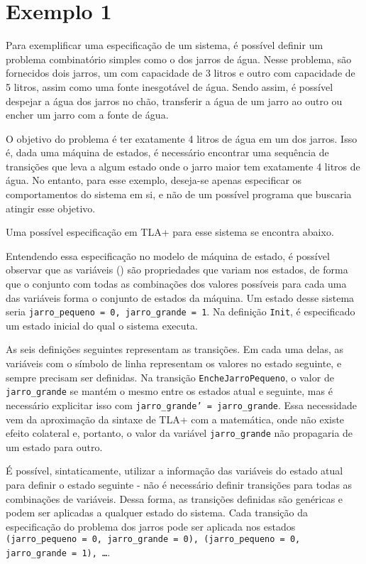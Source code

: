 \section{Exemplo 1}

Para exemplificar uma especificação de um sistema, é possível definir um problema combinatório simples como o dos jarros de água. Nesse problema, são fornecidos dois jarros, um com capacidade de 3 litros e outro com capacidade de 5 litros, assim como uma fonte inesgotável de água. Sendo assim, é possível despejar a água dos jarros no chão, transferir a água de um jarro ao outro ou encher um jarro com a fonte de água.

O objetivo do problema é ter exatamente 4 litros de água em um dos jarros. Isso é, dada uma máquina de estados, é necessário encontrar uma sequência de transições que leva a algum estado onde o jarro maior tem exatamente 4 litros de água. No entanto, para esse exemplo, deseja-se apenas especificar os comportamentos do sistema em si, e não de um possível programa que buscaria atingir esse objetivo.

Uma possível especificação em TLA+ para esse sistema se encontra abaixo.



Entendendo essa especificação no modelo de máquina de estado, é possível observar que as variáveis (\VARIABLES) são propriedades que variam nos estados, de forma que o conjunto com todas as combinações dos valores possíveis para cada uma das variáveis forma o conjunto de estados da máquina. Um estado desse sistema seria \texttt{jarro\_pequeno = 0, jarro\_grande = 1}. Na definição \texttt{Init}, é especificado um estado inicial do qual o sistema executa.

As seis definições seguintes representam as transições. Em cada uma delas, as variáveis com o símbolo de linha representam os valores no estado seguinte, e sempre precisam ser definidas. Na transição \texttt{EncheJarroPequeno}, o valor de \texttt{jarro\_grande} se mantém o mesmo entre os estados atual e seguinte, mas é necessário explicitar isso com \texttt{jarro\_grande' = jarro\_grande}. Essa necessidade vem da aproximação da sintaxe de TLA+ com a matemática, onde não existe efeito colateral e, portanto, o valor da variável \texttt{jarro\_grande} não propagaria de um estado para outro.

É possível, sintaticamente, utilizar a informação das variáveis do estado atual para definir o estado seguinte - não é necessário definir transições para todas as combinações de variáveis. Dessa forma, as transições definidas são genéricas e podem ser aplicadas a qualquer estado do sistema. Cada transição da especificação do problema dos jarros pode ser aplicada nos estados \texttt{(jarro\_pequeno = 0, jarro\_grande = 0), (jarro\_pequeno = 0, jarro\_grande = 1), \dots}.

